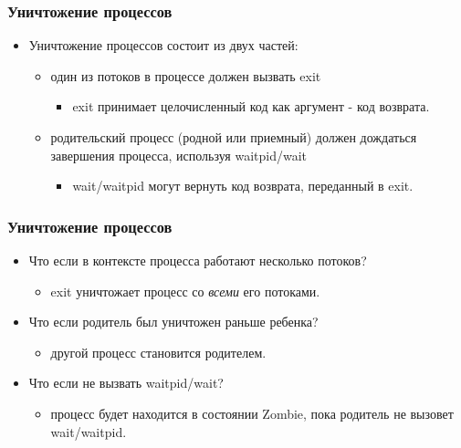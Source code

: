 \begin{frame}
\frametitle{Уничтожение процессов}
\begin{itemize}
    \item<1->Уничтожение процессов состоит из двух частей:
    \begin{itemize}
        \item<2->один из потоков в процессе должен вызвать exit
        \begin{itemize}
            \item<2->exit принимает целочисленный код как аргумент
                 - код возврата.
        \end{itemize}
        \item<3->родительский процесс (родной или приемный) должен
             дождаться завершения процесса, используя waitpid/wait
        \begin{itemize}
            \item<3->wait/waitpid могут вернуть код возврата, переданный в exit.
        \end{itemize}
    \end{itemize}
\end{itemize}
\end{frame}

\begin{frame}
\frametitle{Уничтожение процессов}
\begin{itemize}
    \item<1->Что если в контексте процесса работают несколько потоков?
    \begin{itemize}
        \item<2->exit уничтожает процесс со \emph{всеми} его потоками.
    \end{itemize}
    \item<3->Что если родитель был уничтожен раньше ребенка?
    \begin{itemize}
        \item<4->другой процесс становится родителем.
    \end{itemize}
    \item<5->Что если не вызвать waitpid/wait?
    \begin{itemize}
        \item<6->процесс будет находится в состоянии Zombie, пока родитель
             не вызовет wait/waitpid.
    \end{itemize}
\end{itemize}
\end{frame}

